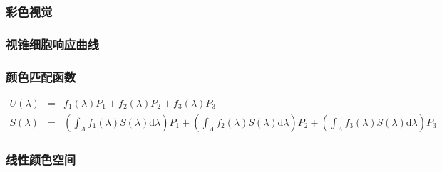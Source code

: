 \documentclass{beamer}
\newcommand{\mathd}{\mathrm{d}}
\begin{document}
{{\begin{frame}
\end{frame}}{\begin{frame}
  \frametitle{彩色视觉}
  
\end{frame}}{\begin{frame}
  \frametitle{视锥细胞响应曲线}
  
  \quad{}
\end{frame}}{\begin{frame}
  \frametitle{颜色匹配函数}
  
  
  \begin{eqnarray*}
    U (\lambda) & = & f_1 (\lambda) P_1 + f_2 (\lambda) P_2 + f_3 (\lambda)
    P_3\\
    S (\lambda) & = & \left( \int_{\Lambda} f_1 (\lambda) S (\lambda) \mathd
    \lambda \right) P_1 + \left( \int_{\Lambda} f_2 (\lambda) S (\lambda)
    \mathd \lambda \right) P_2 + \left( \int_{\Lambda} f_3 (\lambda) S
    (\lambda) \mathd \lambda \right) P_3
  \end{eqnarray*}
\end{frame}}{\begin{frame}
  \frametitle{线性颜色空间}
  

\end{frame}}}
\end{document}
